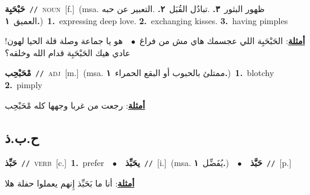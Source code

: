 \documentclass[10pt,a4paper,twoside]{article} %
\begin{document}
\begin{multicols}{2}
{\setlength\topsep{0pt}\textbf{\foreignlanguage{arabic}{حَبْحَبِة}}\ {\color{gray}\texttt{//}\color{black}}\ \textsc{noun}\ [f.]\ \color{gray}(msa. \foreignlanguage{arabic}{ظهور البثور}~\foreignlanguage{arabic}{\textbf{٣.}}  .\foreignlanguage{arabic}{تبادُل القُبَل}~\foreignlanguage{arabic}{\textbf{٢.}}  .\foreignlanguage{arabic}{التعبير عن حبه العميق}~\foreignlanguage{arabic}{\textbf{١.}})\color{black}\ \textbf{1.}~expressing deep love.  \textbf{2.}~exchanging kisses.  \textbf{3.}~having pimples\  \begin{flushright}\color{gray}\foreignlanguage{arabic}{\textbf{\underline{\foreignlanguage{arabic}{أمثلة}}}: الحَبْحَبِة اللي عجسمك هاي مش من فراغ\ $\bullet$\ \  هو يا جماعة وصلة قلة الحيا لهون! عادي هيك الحَبْحَبِة قدام الله وخلقه؟}\end{flushright}\color{black}} \vspace{2mm}

{\setlength\topsep{0pt}\textbf{\foreignlanguage{arabic}{مْحَبْحِب}}\ {\color{gray}\texttt{//}\color{black}}\ \textsc{adj}\ [m.]\ \color{gray}(msa. \foreignlanguage{arabic}{ممتلئ بالحبوب أو البقع الحمراء}~\foreignlanguage{arabic}{\textbf{١.}})\color{black}\ \textbf{1.}~blotchy  \textbf{2.}~pimply\  \begin{flushright}\color{gray}\foreignlanguage{arabic}{\textbf{\underline{\foreignlanguage{arabic}{أمثلة}}}: رجعت من غربا وجهها كله مْحَبْحِب}\end{flushright}\color{black}} \vspace{2mm}

\vspace{-3mm}
\subsection*{\color{blue}\foreignlanguage{arabic}{ح.ب.ذ}\color{blue}{}} 

{\setlength\topsep{0pt}\textbf{\foreignlanguage{arabic}{حَبِّذ}}\ {\color{gray}\texttt{//}\color{black}}\ \textsc{verb}\ [c.]\ \textbf{1.}~prefer\ \ $\bullet$\ \ \setlength\topsep{0pt}\textbf{\foreignlanguage{arabic}{يحَبِّذ}}\ {\color{gray}\texttt{//}\color{black}}\ [i.]\ \color{gray}(msa. \foreignlanguage{arabic}{يُفَضِّل}~\foreignlanguage{arabic}{\textbf{١.}})\color{black}\ \ $\bullet$\ \ \setlength\topsep{0pt}\textbf{\foreignlanguage{arabic}{حَبَّذ}}\ {\color{gray}\texttt{//}\color{black}}\ [p.]\  \begin{flushright}\color{gray}\foreignlanguage{arabic}{\textbf{\underline{\foreignlanguage{arabic}{أمثلة}}}: أنا ما بَحَبِّذ إِنهم يعملوا حفلة هلا}\end{flushright}\color{black}} \vspace{2mm}


\end{multicols}
\end{document}
